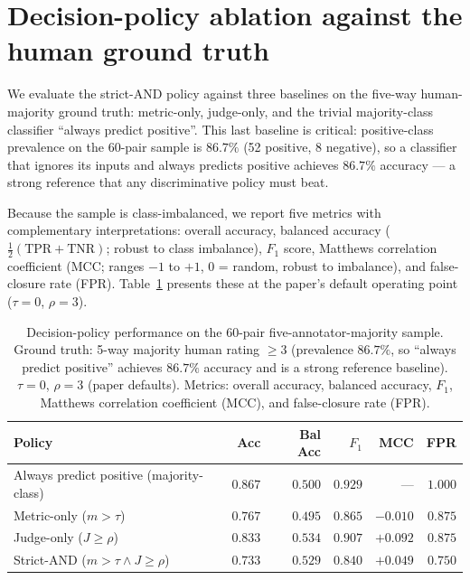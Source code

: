 \section{Decision-policy ablation against the human ground truth}
\label{sec:human_eval_strict_and}

We evaluate the strict-AND policy against three baselines on the
five-way human-majority ground truth: metric-only, judge-only, and the
trivial majority-class classifier ``always predict positive''. This
last baseline is critical: positive-class prevalence on the 60-pair
sample is $86.7\%$ (52 positive, 8 negative), so a classifier that
ignores its inputs and always predicts positive achieves $86.7\%$
accuracy --- a strong reference that any discriminative policy must
beat.

Because the sample is class-imbalanced, we report five metrics with
complementary interpretations: overall accuracy, balanced accuracy
($\tfrac{1}{2}(\text{TPR} + \text{TNR})$; robust to class imbalance),
$F_1$ score, Matthews correlation coefficient (MCC; ranges $-1$ to
$+1$, $0$ = random, robust to imbalance), and false-closure rate
(FPR). Table~\ref{tab:strict_and_ablation} presents these at the
paper's default operating point ($\tau = 0$, $\rho = 3$).

\begin{table}[!htbp]
  \centering
  \caption{Decision-policy performance on the 60-pair
    five-annotator-majority sample. Ground truth: 5-way majority human
    rating $\geq 3$ (prevalence $86.7\%$, so ``always predict positive''
    achieves $86.7\%$ accuracy and is a strong reference baseline).
    $\tau = 0$, $\rho = 3$ (paper defaults). Metrics: overall accuracy,
    balanced accuracy, $F_1$, Matthews correlation coefficient (MCC),
    and false-closure rate (FPR).}
  \label{tab:strict_and_ablation}
  \begin{tabular}{lrrrrr}
    \toprule
    Policy & Acc & Bal Acc & $F_1$ & MCC & FPR \\
    \midrule
    Always predict positive (majority-class) & $\mathbf{0.867}$ & $0.500$ & $\mathbf{0.929}$ & --- & $1.000$ \\
    \midrule
    Metric-only ($m > \tau$)                 & $0.767$ & $0.495$ & $0.865$ & $-0.010$ & $0.875$ \\
    Judge-only ($J \geq \rho$)               & $0.833$ & $\mathbf{0.534}$ & $0.907$ & $\mathbf{+0.092}$ & $0.875$ \\
    Strict-AND ($m > \tau \wedge J \geq \rho$) & $0.733$ & $0.529$ & $0.840$ & $+0.049$ & $\mathbf{0.750}$ \\
    \bottomrule
  \end{tabular}
\end{table}

